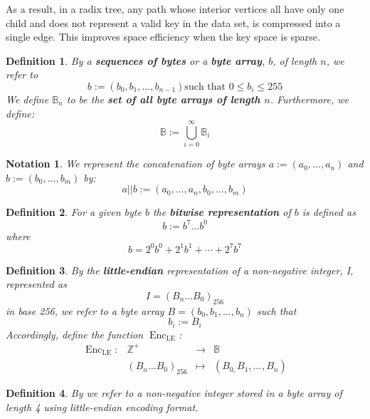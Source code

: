 \documentclass{book}
\newcommand{\assign}{:=}
\newcommand{\tmname}[1]{\textsc{#1}}
\newcommand{\tmop}[1]{\ensuremath{\operatorname{#1}}}
\newcommand{\tmstrong}[1]{\textbf{#1}}
\newcommand{\tmverbatim}[1]{{\ttfamily{#1}}}
\newtheorem{definition}{Definition}
\newtheorem{notation}{Notation}
\newtheorem{definition}{Definition}
\newtheorem{notation}{Notation}
\begin{document}
As a result, in a radix tree, any path whose interior vertices all have only
one child and does not represent a valid key in the data set, is compressed
into a single edge. This improves space efficiency when the key space is
sparse.

\begin{definition}
  By a {\tmstrong{sequences of bytes}} or a {\tmstrong{byte array}}, $b$, of
  length $n$, we refer to
  \[ b \assign (b_0, b_1, ..., b_{n - 1})  \text{such that } 0 \leqslant b_i
     \leqslant 255 \]
  We define $\mathbb{B}_n$ to be the {\tmstrong{set of all byte arrays of
  length $n$}}. Furthermore, we define:
  \[ \mathbb{B} \assign \bigcup^{\infty}_{i = 0} \mathbb{B}_i \]
\end{definition}

\begin{notation}
  We represent the concatenation of byte arrays $a \assign (a_0, \ldots, a_n)$
  and $b \assign (b_0, \ldots, b_m)$ by:
  \[ a || b \assign (a_0, \ldots, a_n, b_0, \ldots, b_m) \]
\end{notation}

\begin{definition}
  \label{defn-bit-rep}For a given byte $b$ the {\tmstrong{bitwise
  representation}} of $b$ is defined as
  \[ b \assign b^7 \ldots b^0 \]
  where
  \[ b = 2^0 b^0 + 2^1 b^1 + \cdots + 2^7 b^7 \]
\end{definition}

\begin{definition}
  \label{defn-little-endian}By \tmverbatim{}the {\tmstrong{little-endian}}
  representation of a non-negative integer, I, represented as
  \[ I = (B_n \ldots B_0)_{256} \]
  in base 256, we refer to a byte array $B = (b_0, b_1, \ldots, b_n)$ such
  that
  \[ b_i \assign B_i \]
  Accordingly, define the function $\tmop{Enc}_{\tmop{LE}}$:
  \[ \begin{array}{llll}
       \tmop{Enc}_{\tmop{LE}} : & \mathbb{Z}^+ & \rightarrow & \mathbb{B}\\
       & (B_n \ldots B_0)_{256} & \mapsto & (B_{0,} B_1, \ldots_{}, B_n)
     \end{array} \]
  
\end{definition}

\begin{definition}
  By {\tmname{{\tmstrong{\tmverbatim{UINT32}}}}} we refer to a non-negative
  integer stored in a byte array of length 4 using little-endian encoding
  format.
\end{definition}
\end{document}
